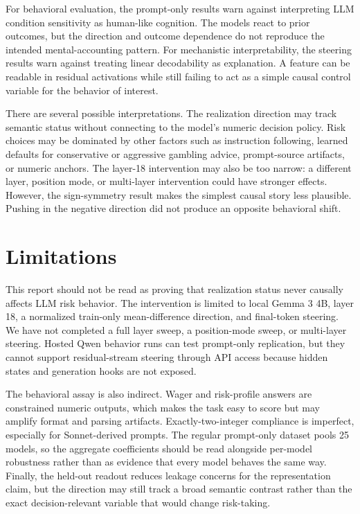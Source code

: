 \documentclass[final]{sparreport}
\begin{document}
For behavioral evaluation, the prompt-only results warn against interpreting LLM condition sensitivity as human-like cognition. The models react to prior outcomes, but the direction and outcome dependence do not reproduce the intended mental-accounting pattern. For mechanistic interpretability, the steering results warn against treating linear decodability as explanation. A feature can be readable in residual activations while still failing to act as a simple causal control variable for the behavior of interest.

There are several possible interpretations. The realization direction may track semantic status without connecting to the model's numeric decision policy. Risk choices may be dominated by other factors such as instruction following, learned defaults for conservative or aggressive gambling advice, prompt-source artifacts, or numeric anchors. The layer-18 intervention may also be too narrow: a different layer, position mode, or multi-layer intervention could have stronger effects. However, the sign-symmetry result makes the simplest causal story less plausible. Pushing in the negative direction did not produce an opposite behavioral shift.

\section{Limitations}

This report should not be read as proving that realization status never causally affects LLM risk behavior. The intervention is limited to local Gemma 3 4B, layer 18, a normalized train-only mean-difference direction, and final-token steering. We have not completed a full layer sweep, a position-mode sweep, or multi-layer steering. Hosted Qwen behavior runs can test prompt-only replication, but they cannot support residual-stream steering through API access because hidden states and generation hooks are not exposed.

The behavioral assay is also indirect. Wager and risk-profile answers are constrained numeric outputs, which makes the task easy to score but may amplify format and parsing artifacts. Exactly-two-integer compliance is imperfect, especially for Sonnet-derived prompts. The regular prompt-only dataset pools 25 models, so the aggregate coefficients should be read alongside per-model robustness rather than as evidence that every model behaves the same way. Finally, the held-out readout reduces leakage concerns for the representation claim, but the direction may still track a broad semantic contrast rather than the exact decision-relevant variable that would change risk-taking.
\end{document}
